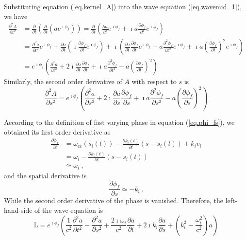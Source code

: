 Substituting equation (\ref{eq.kernel_A}) into the wave equation (\ref{eq.wavemid_1}), we have 
\begin{equation}
    \begin{aligned}
    \frac{\partial^2  A}{\partial t^2} &= \frac{\partial }{\partial t}\left(\frac{\partial }{\partial t}(a e^{\imath \phi_f})\right) = \frac{\partial }{\partial t}\left(\frac{\partial a}{\partial t} e^{\imath \phi_f} + \imath a \frac{\partial \phi_f}{\partial t}e^{\imath \phi_f} \right)
    \\
    & = \frac{\partial^2 a}{\partial t^2} e^{\imath \phi_f} + \frac{\partial a}{\partial t} (\imath \frac{\partial \phi_f}{\partial t} e^{\imath \phi_f}) +
     \imath \left(\frac{\partial a}{\partial t} \frac{\partial \phi_f}{\partial t}e^{\imath \phi_f} + a \frac{\partial ^2 \phi_f}{\partial t^2}e^{\imath \phi_f} + \imath a \left(\frac{\partial \phi_f}{\partial t}\right)^2e^{\imath \phi_f}  \right)
     \\
     & = e^{\imath \phi_f} \left(\frac{\partial^2 a}{\partial t^2} + 2 \imath \frac{\partial a}{\partial t}\frac{\partial \phi_f}{\partial t} + \imath a \frac{\partial^2 \phi_f}{\partial t^2} - a \left(\frac{\partial \phi_f}{\partial t}\right)^2\right)
    \end{aligned}
\end{equation}
Similarly, the second order derivative of $A$ with respect to $s$ is 
\begin{equation}
    \frac{\partial^2  A}{\partial s^2} = e^{\imath \phi_f} \left(\frac{\partial^2 a}{\partial s^2} + 2 \imath \frac{\partial a}{\partial s}\frac{\partial \phi_f}{\partial s} + \imath a \frac{\partial^2 \phi_f}{\partial s^2} - a \left(\frac{\partial \phi_f}{\partial s}\right)^2\right)
\end{equation}

According to the definition of fast varying phase in equation (\ref{eq.phi_fs}), we obtained its first order derivative as
\begin{equation}
    \begin{aligned}
    \frac{\partial \phi_f}{\partial t} & = \omega_{ce}(s_i(t)) - \frac{\partial k_i(t)}{\partial t}(s-s_i(t)) + k_i v_i
    \\
    & = \omega_i - \frac{\partial k_i(t)}{\partial t}(s-s_i(t))
    \\
    &\simeq \omega_i~,
    \end{aligned}
\end{equation}
and the spatial derivative is 
\begin{equation}
    \frac{\partial \phi_f}{\partial s} \simeq - k_i~.
\end{equation}
While the second order derivative of the phase is vanished.
Therefore, the left-hand-side of the wave equation is 
\begin{equation}
    \mathrm{L} = e^{\imath \phi_f} \left(\frac{1}{c^2}\frac{\partial^2 a}{\partial t^2} - \frac{\partial^2 a}{\partial s^2} + \frac{2 \imath \omega_i}{c^2} \frac{\partial a}{\partial t}+ 2 \imath k_i \frac{\partial a}{\partial s} + (k_i^2 - \frac{\omega_i^2}{c^2})a\right)
\end{equation}

